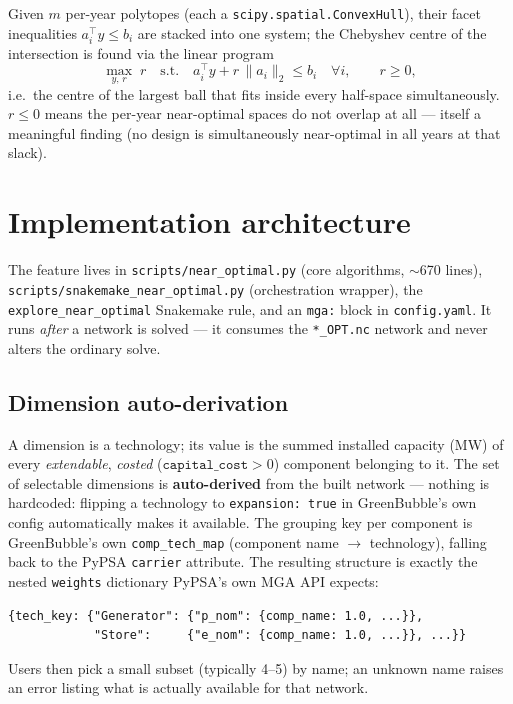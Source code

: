 \documentclass[11pt]{article}
\begin{document}
Given $m$ per-year polytopes (each a \texttt{scipy.spatial.ConvexHull}),
their facet inequalities $a_i^\top y \le b_i$ are stacked into one system;
the Chebyshev centre of the intersection is found via the linear program
\begin{equation}
  \max_{y,\, r}\; r
  \quad \text{s.t.} \quad
  a_i^\top y + r\,\lVert a_i \rVert_2 \le b_i \quad \forall i, \qquad r \ge 0,
\end{equation}
i.e.\ the centre of the largest ball that fits inside every half-space
simultaneously. $r \le 0$ means the per-year near-optimal spaces do not
overlap at all --- itself a meaningful finding (no design is simultaneously
near-optimal in all years at that slack).

\section{Implementation architecture}
The feature lives in \texttt{scripts/near\_optimal.py} (core algorithms,
$\sim$670 lines), \texttt{scripts/snakemake\_near\_optimal.py} (orchestration
wrapper), the \texttt{explore\_near\_optimal} Snakemake rule, and an
\texttt{mga:} block in \texttt{config.yaml}. It runs \emph{after} a network
is solved --- it consumes the \texttt{*\_OPT.nc} network and never alters
the ordinary solve.

\subsection{Dimension auto-derivation}
A dimension is a technology; its value is the summed installed capacity
(MW) of every \emph{extendable}, \emph{costed} ($\texttt{capital\_cost}>0$)
component belonging to it. The set of selectable dimensions is
\textbf{auto-derived} from the built network --- nothing is hardcoded:
flipping a technology to \texttt{expansion: true} in GreenBubble's own
config automatically makes it available. The grouping key per component is
GreenBubble's own \texttt{comp\_tech\_map} (component name $\to$ technology),
falling back to the PyPSA \texttt{carrier} attribute. The resulting
structure is exactly the nested \texttt{weights} dictionary PyPSA's own MGA
API expects:
\begin{lstlisting}
{tech_key: {"Generator": {"p_nom": {comp_name: 1.0, ...}},
            "Store":     {"e_nom": {comp_name: 1.0, ...}}, ...}}
\end{lstlisting}
Users then pick a small subset (typically 4--5) by name; an unknown name
raises an error listing what is actually available for that network.
\end{document}
